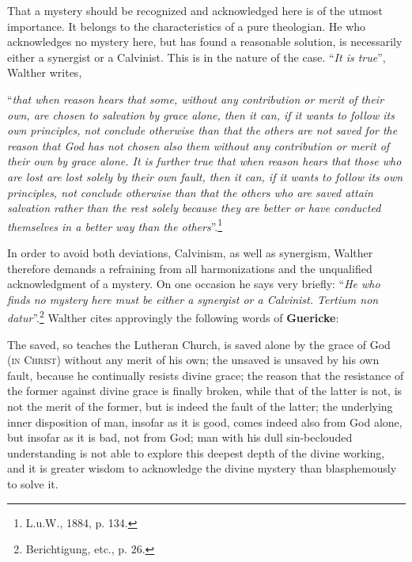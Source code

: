                 That a mystery should be recognized and acknowledged here is of the utmost importance.  It belongs to the characteristics of a pure theologian.  He who acknowledges no mystery here, but has found a reasonable solution, is necessarily either a synergist or a Calvinist.  This is in the nature of the case.  “\textit{It is true}”, Walther writes, \begin{displayquote}“\textit{that when reason hears that some, without any contribution or merit of their own, are chosen to salvation by grace alone, then it can, if it wants to follow its own principles, not conclude otherwise than that the others are not saved for the reason that God has not chosen also them without any contribution or merit of their own by grace alone.  It is further true that when reason hears that those who are lost are lost solely by their own fault, then it can, if it wants to follow its own principles, not conclude otherwise than that the others who are saved attain salvation rather than the rest solely because they are better or have conducted themselves in a better way than the others}”.\footnote{L.u.W., 1884, p. 134.}\end{displayquote}  In order to avoid both deviations, Calvinism, as well as synergism, Walther therefore demands a refraining from all harmonizations and the unqualified acknowledgment of a mystery.  On one occasion he says very briefly: “\textit{He who finds no mystery here must be either a synergist or a Calvinist.  Tertium non datur}”.\footnote{Berichtigung, etc., p. 26.}  Walther cites approvingly the following words of \textbf{Guericke}: \begin{fancyquotes}The saved, so teaches the Lutheran Church, is saved alone by the grace of God {\scriptsize\textsc{(in Christ)}} without any merit of his own; the unsaved is unsaved by his own fault, because he continually resists divine grace; the reason that the resistance of the former against divine grace is finally broken, while that of the latter is not, is not the merit of the former, but is indeed the fault of the latter; the underlying inner disposition of man, insofar as it is good, comes indeed also from God alone, but insofar as it is bad, not from God; man with his dull sin-beclouded understanding is not able to explore this deepest depth of the divine working, and it is greater wisdom to acknowledge the divine mystery than blasphemously to solve it.\end{fancyquotes}

